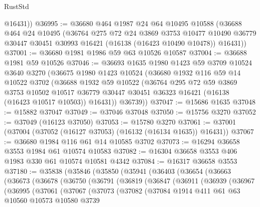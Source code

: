 \begin{lexlean}{RustStd}
\begin{coremodule}
        @16431))
@36995 := @36680
    @464
    @1987
    @24
    @64
    @10495
    @10588
    (@36688
      @464
      @24
      @10495
      (@36764
        @275
        @72
        @24
        @3869
        @3753
        @10477
        @10490
        @36779
        @30447
        @30451
        @30993
        @16421
        (@16138 (@16423 @10490 @10478))
        @16431))
@37001 := @36680 @1981 @1986 @59 @63 @10526 @10587
@37004 := @36688 @1981 @59 @10526
@37046 := @36693
    @1635
    @1980
    @1423
    @59
    @3709
    @10524
    @3640
    @3270
    (@36675
      @1980
      @1423
      @10524
      (@36680
        @1932
        @116
        @59
        @14
        @10522
        @3702
        (@36688
          @1932
          @59
          @10522
          (@36764
            @295
            @72
            @59
            @3869
            @3753
            @10502
            @10517
            @36779
            @30447
            @30451
            @36323
            @16421
            (@16138 (@16423 @10517 @10503))
            @16431))
        @36739))
@37047 := @15686 @1635
@37048 := @15882 @37047
@37049 := @37046 @37048
@37050 := @15756 @3270
@37052 := @37049 (@16123 @37050)
@37053 := @15780 @3270
@37061 := @37001 (@37004 (@37052 (@16127 @37053) (@16132 (@16134 @1635)) @16431))
@37067 := @36680 @1984 @116 @61 @14 @10585 @3702
@37073 := @16294 @36658 @3553 @1984 @61 @10574 @10583
@37082 := @16304 @36658 @3553 @406 @1983 @330 @61 @10574 @10581 @4342
@37084 := @16317 @36658 @3553
@37180 := @35838
    (@35846
      (@35850
        (@35941
          (@36403
            (@36654
              (@36663
                (@36673
                  (@36678
                    (@36750
                      (@36791
                        (@36819
                          (@36847
                            (@36911
                              (@36939
                                (@36967
                                  (@36995
                                    (@37061
                                      (@37067
                                        (@37073
                                          (@37082
                                            (@37084
                                              @1914
                                              @411
                                              @61
                                              @63
                                              @10560
                                              @10573
                                              @10580
                                              @3739

\end{coremodule}
\end{lexlean}
